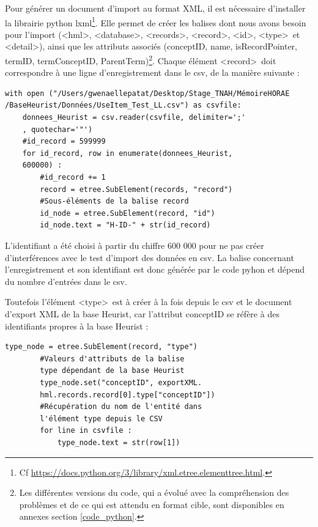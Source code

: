 \documentclass[a4paper,12pt,twoside]{book}
\begin{document}
	Pour générer un document d'import au format XML, il est nécessaire d'installer la librairie python lxml\footnote{Cf \url{https://docs.python.org/3/library/xml.etree.elementtree.html}.}. Elle permet de créer les balises dont nous avons besoin pour l'import (\textless hml\textgreater, \textless database\textgreater, \textless records\textgreater, \textless record\textgreater, \textless id\textgreater, \textless type\textgreater~et \textless detail\textgreater ), ainsi que les attributs associés (conceptID, name, isRecordPointer, termID, termConceptID, ParentTerm)\footnote{Les différentes versions du code, qui a évolué avec la compréhension des problèmes et de ce qui est attendu en format cible, sont disponibles en annexes section \ref{code_python}.}. Chaque élément \textless record\textgreater~doit correspondre à une ligne d'enregistrement dans le csv, de la manière suivante : 
	\begin{verbatim}
with open ("/Users/gwenaellepatat/Desktop/Stage_TNAH/MémoireHORAE
/BaseHeurist/Données/UseItem_Test_LL.csv") as csvfile:
    donnees_Heurist = csv.reader(csvfile, delimiter=';'
    , quotechar='"')
    #id_record = 599999
    for id_record, row in enumerate(donnees_Heurist,
    600000) :
        #id_record += 1
        record = etree.SubElement(records, "record")
        #Sous-éléments de la balise record
        id_node = etree.SubElement(record, "id")
        id_node.text = "H-ID-" + str(id_record)
	\end{verbatim}
L'identifiant a été choisi à partir du chiffre 600 000 pour ne pas créer d'interférences avec le test d'import des données en csv. La balise concernant l'enregistrement et son identifiant est donc générée par le code pyhon et dépend du nombre d'entrées dans le csv. 

Toutefois l'élément \textless type\textgreater~est à créer à la fois depuis le csv et le document d'export XML de la base Heurist, car l'attribut conceptID se réfère à des identifiants propres à la base Heurist : 
\begin{verbatim}
type_node = etree.SubElement(record, "type")
        #Valeurs d'attributs de la balise 
        type dépendant de la base Heurist
        type_node.set("conceptID", exportXML.
        hml.records.record[0].type["conceptID"])
        #Récupération du nom de l'entité dans 
        l'élément type depuis le CSV
        for line in csvfile :
            type_node.text = str(row[1])
\end{verbatim}
\end{document}

